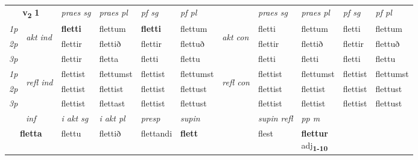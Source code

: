 \noindent
\begin{tabular}{lllllllllll} \toprule
\multicolumn{2}{c}{\textbf{v{\textsubscript{2}}} \Large{\textbf{1}}}  &  \textit{praes sg}  & \textit{praes pl}  &\textit{ pf sg} & \textit{pf pl} &  &  \textit{praes sg}  & \textit{praes pl}  & \textit{pf sg} & \textit{pf pl } \\*
	\cmidrule{3-6} \cmidrule{8-11}
 {\textit{1p}} & \multirow{3}{*}{\begin{turn}{90}\textit{akt ind}\end{turn}} & \textbf{fletti} & flettum & \textbf{fletti} & flettum & \multirow{3}{*}{\begin{turn}{90}\textit{akt con}\end{turn}} &fletti & flettum & fletti & flettum\\*
 {\textit{2p}} &  &  flettir  & flettið & flettir & flettuð & & flettir & flettið & flettir & flettuð \\*
{\textit{3p}} &  & flettir & fletta & fletti & flettu & & fletti & fletti& fletti & flettu \\*
\cmidrule{3-6} \cmidrule{8-11}
 {\textit{1p}} & \multirow{3}{*}{\begin{turn}{90}\textit{refl ind}\end{turn}}  & flettist & flettumst & flettist & flettumst & \multirow{3}{*}{\begin{turn}{90}\textit{refl con}\end{turn}}  &flettist & flettumst & flettist & flettumst \\*
 {\textit{2p}} &  & flettist & flettist & flettist & flettust & &flettist & flettist & flettist & flettust \\*
 {\textit{3p}}  & & flettist & flettast & flettist & flettust & & flettist & flettist& flettist & flettust \\*
\cmidrule{3-6} \cmidrule{8-11}

   \multicolumn{2}{c}{\textit{inf}}  & \textit{i akt sg} & \textit{i akt pl}   & \textit{presp} & \textit{supin} && \textit{supin refl} & \textit{pp m} \\*
  \multicolumn{2}{c}{\textbf{fletta}} & flettu  & flettið   & flettandi &  \textbf{flett} && flest & \specialcell{\textbf{flettur} \\ adj\textbf{\textsubscript{1-10}}} \\*
\end{tabular}

